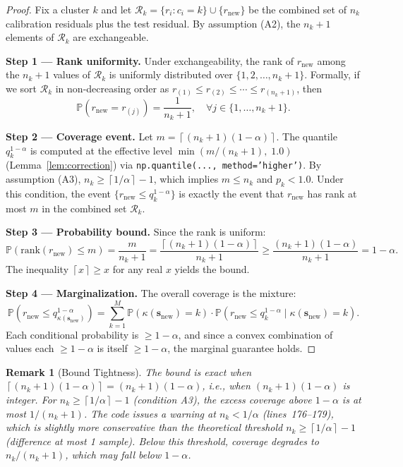 \documentclass[11pt]{article}
\newtheorem{remark}[theorem]{Remark}
\newcommand{\Pbb}{\mathbb{P}}
\newcommand{\ceil}[1]{\left\lceil #1 \right\rceil}
\begin{document}
\begin{proof}
Fix a cluster $k$ and let $\mathcal{R}_k = \{r_i \colon c_i = k\} \cup \{r_{\text{new}}\}$ be the combined set of $n_k$ calibration residuals plus the test residual. By assumption (A2), the $n_k + 1$ elements of $\mathcal{R}_k$ are exchangeable.

\textbf{Step 1 — Rank uniformity.} Under exchangeability, the rank of $r_{\text{new}}$ among the $n_k + 1$ values of $\mathcal{R}_k$ is uniformly distributed over $\{1, 2, \dots, n_k+1\}$. Formally, if we sort $\mathcal{R}_k$ in non-decreasing order as $r_{(1)} \leq r_{(2)} \leq \cdots \leq r_{(n_k+1)}$, then
\[
\Pbb(r_{\text{new}} = r_{(j)}) = \frac{1}{n_k + 1}, \quad \forall j \in \{1,\dots,n_k+1\}.
\]

\textbf{Step 2 — Coverage event.} Let $m = \ceil{(n_k+1)(1-\alpha)}$. The quantile $q_k^{1-\alpha}$ is computed at the effective level $\min(m/(n_k+1),\; 1.0)$ (Lemma~\ref{lem:correction}) via \texttt{np.quantile(..., method='higher')}. By assumption (A3), $n_k \geq \ceil{1/\alpha} - 1$, which implies $m \leq n_k$ and $p_k < 1.0$. Under this condition, the event $\{r_{\text{new}} \leq q_k^{1-\alpha}\}$ is exactly the event that $r_{\text{new}}$ has rank at most $m$ in the combined set $\mathcal{R}_k$.

\textbf{Step 3 — Probability bound.} Since the rank is uniform:
\[
\Pbb(\text{rank}(r_{\text{new}}) \leq m) = \frac{m}{n_k + 1}
= \frac{\ceil{(n_k+1)(1-\alpha)}}{n_k + 1}
\geq \frac{(n_k+1)(1-\alpha)}{n_k + 1}
= 1 - \alpha.
\]
The inequality $\ceil{x} \geq x$ for any real $x$ yields the bound.

\textbf{Step 4 — Marginalization.} The overall coverage is the mixture:
\[
\Pbb(r_{\text{new}} \leq q_{\kappa(\mathbf{s}_{\text{new}})}^{1-\alpha})
= \sum_{k=1}^{M} \Pbb(\kappa(\mathbf{s}_{\text{new}}) = k) \cdot
   \Pbb(r_{\text{new}} \leq q_k^{1-\alpha} \mid \kappa(\mathbf{s}_{\text{new}}) = k).
\]
Each conditional probability is $\geq 1-\alpha$, and since a convex combination of values each $\geq 1-\alpha$ is itself $\geq 1-\alpha$, the marginal guarantee holds.
\end{proof}

\begin{remark}[Bound Tightness]
The bound is exact when $\ceil{(n_k+1)(1-\alpha)} = (n_k+1)(1-\alpha)$, i.e., when $(n_k+1)(1-\alpha)$ is integer. For $n_k \geq \ceil{1/\alpha} - 1$ (condition A3), the excess coverage above $1-\alpha$ is at most $1/(n_k+1)$. The code issues a warning at $n_k < 1/\alpha$ (lines~176--179), which is slightly more conservative than the theoretical threshold $n_k \geq \ceil{1/\alpha} - 1$ (difference at most 1 sample). Below this threshold, coverage degrades to $n_k/(n_k+1)$, which may fall below $1-\alpha$.
\end{remark}
\end{document}
